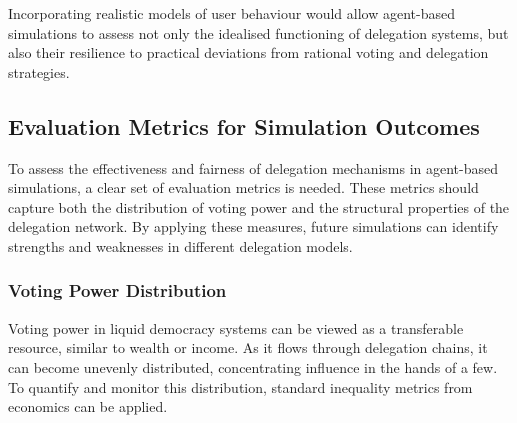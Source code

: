 Incorporating realistic models of user behaviour would allow agent-based simulations to assess not only the idealised functioning of delegation systems, but also their resilience to practical deviations from rational voting and delegation strategies.





\subsection{Evaluation Metrics for Simulation Outcomes}

To assess the effectiveness and fairness of delegation mechanisms in agent-based simulations, a clear set of evaluation metrics is needed. These metrics should capture both the distribution of voting power and the structural properties of the delegation network. By applying these measures, future simulations can identify strengths and weaknesses in different delegation models.

\subsubsection{Voting Power Distribution}

Voting power in liquid democracy systems can be viewed as a transferable resource, similar to wealth or income. As it flows through delegation chains, it can become unevenly distributed, concentrating influence in the hands of a few. To quantify and monitor this distribution, standard inequality metrics from economics can be applied.

